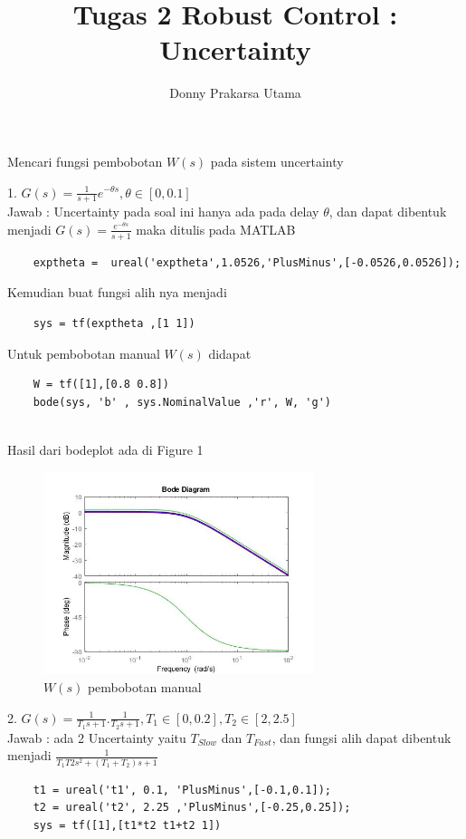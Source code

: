 \documentclass[14pt]{article}
\title{Tugas 2 Robust Control : Uncertainty }
\author{Donny Prakarsa Utama}
\begin{document}
   
Mencari fungsi pembobotan $W(s)$ pada sistem uncertainty

1. $G(s)=\frac{1}{s+1}e^{-\theta s} ,\theta \in [0,0.1]$\\
Jawab :
Uncertainty pada soal ini hanya ada pada delay $ \theta $, dan dapat dibentuk menjadi $G(s)=\frac{e^{-\theta s}}{s+1}$ maka ditulis pada MATLAB
\begin{verbatim}
    exptheta =  ureal('exptheta',1.0526,'PlusMinus',[-0.0526,0.0526]);
\end{verbatim}
Kemudian buat fungsi alih nya menjadi
\begin{verbatim}
    sys = tf(exptheta ,[1 1])
\end{verbatim} 
Untuk pembobotan manual $W(s)$ didapat 
\begin{verbatim}
    W = tf([1],[0.8 0.8]) 
    bode(sys, 'b' , sys.NominalValue ,'r', W, 'g')
\end{verbatim}\\
Hasil dari bodeplot ada di Figure 1
\begin{figure}[hp]
    \centering
    \includegraphics[width=79mm]{bodemanual1.jpg}
    \caption{$W(s)$ pembobotan manual \label{overflow}}
\end{figure}


2. $G(s)=\frac{1}{T_{1}s+1}.\frac{1}{T_{2}s+1} ,T_{1} \in [0,0.2], T_{2} \in [2,2.5]$ \\

Jawab : ada 2 Uncertainty yaitu $T_{Slow}$ dan $T_{Fast}$, dan fungsi alih dapat dibentuk menjadi $ \frac{1}{T_{1}T{2}s^2 + (T_{1}+T_{2})s + 1}$
\begin{verbatim}
    t1 = ureal('t1', 0.1, 'PlusMinus',[-0.1,0.1]);
    t2 = ureal('t2', 2.25 ,'PlusMinus',[-0.25,0.25]);
    sys = tf([1],[t1*t2 t1+t2 1])
\end{verbatim}
\end{document}
